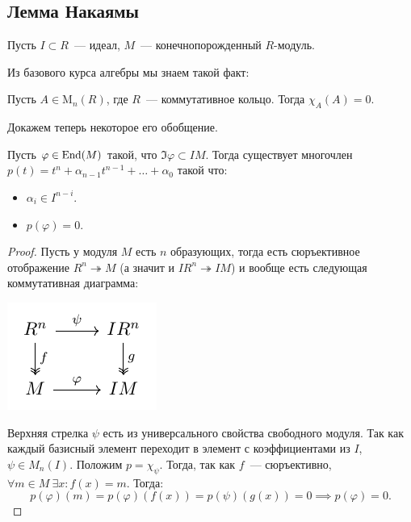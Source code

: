 	
	\subsection{Лемма Накаямы}

	Пусть $I \subset R$~--- идеал, $M$~--- конечнопорожденный $R$-модуль. 

	Из базового курса алгебры мы знаем такой факт: 

	\begin{theorem}\label{standard_GK}
		Пусть $A \in \mathrm{M}_{n}(R)$, где $R$~--- коммутативное кольцо. Тогда $\chi_{A}(A) = 0$.
	\end{theorem}

	Докажем теперь некоторое его обобщение. 

	\begin{theorem}
		Пусть $\varphi \in \operatorname{End}(M)$ такой, что $\Im{\varphi} \subset IM$. Тогда существует многочлен $p(t) = t^n + \alpha_{n - 1}t^{n - 1} + \ldots + \alpha_0$ такой что: 
		\begin{itemize}
			\item $\alpha_i \in I^{n - i}$.
			\item $p(\varphi) = 0$.
		\end{itemize}
	\end{theorem}

	\begin{proof}
		Пусть у модуля $M$ есть $n$ образующих, тогда есть сюръективное отображение $R^n \twoheadrightarrow M$ (а значит и $IR^n \twoheadrightarrow IM$) и вообще есть следующая коммутативная диаграмма: 
		\begin{center}
		\includegraphics{lectures/3/commutative diagramms/GK.pdf}
 		\end{center}

 		Верхняя стрелка $\psi$ есть из универсального свойства свободного модуля. Так как каждый базисный элемент переходит в элемент с коэффициентами из $I$, $\psi \in M_{n}(I)$. Положим $p = \chi_{\psi}$. Тогда, так как $f$~--- сюръективно, $\forall m \in M \ \exists x\colon f(x) = m$. Тогда:
 		\[
 			p(\varphi)(m) = p(\varphi)(f(x)) = p(\psi)(g(x)) = 0 \implies p(\varphi) = 0.
 		\]
	\end{proof}

